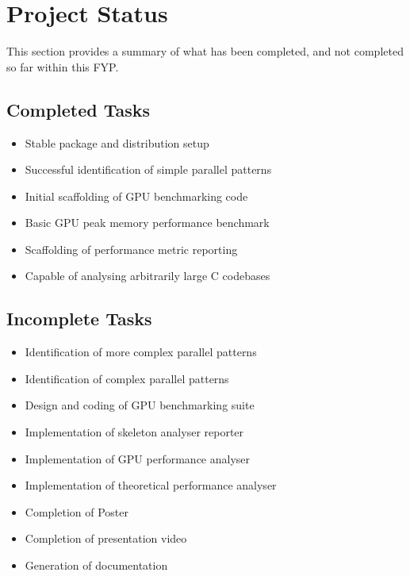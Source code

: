 
\section{Project Status}

This section provides a summary of what has been completed, and not completed so far within this FYP.


\subsection{Completed Tasks}

\begin{itemize}
\item Stable package and distribution setup
\item Successful identification of simple parallel patterns
\item Initial scaffolding of GPU benchmarking code
\item Basic GPU peak memory performance benchmark
\item Scaffolding of performance metric reporting
\item Capable of analysing arbitrarily large C codebases
\end{itemize}


\subsection{Incomplete Tasks}

\begin{itemize}
\item Identification of more complex parallel patterns
\item Identification of complex parallel patterns
\item Design and coding of GPU benchmarking suite
\item Implementation of skeleton analyser reporter
\item Implementation of GPU performance analyser
\item Implementation of theoretical performance analyser
\item Completion of Poster
\item Completion of presentation video
\item Generation of documentation
\end{itemize}


